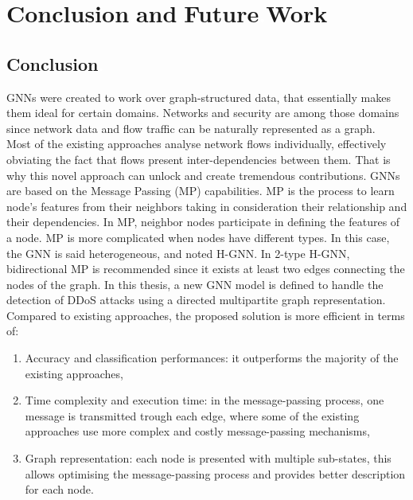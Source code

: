 \chapter{Conclusion\textcolor{white}{.}and\textcolor{white}{.}Future\textcolor{white}{.}Work}
\label{chapter:conclusion}

\section{Conclusion\textcolor{white}{.}}
GNNs were created to work over graph-structured data, that essentially makes
them ideal for certain domains. Networks and security are among those domains since network data and flow traffic can be naturally represented as a graph. \\
Most of the existing
approaches analyse network flows individually, effectively obviating the fact that
flows present inter-dependencies between them. That is why this novel approach
can unlock and create tremendous contributions.
GNNs are based on the Message Passing (MP) capabilities. MP is the process to learn node's features from their neighbors taking in consideration their relationship and their dependencies. In MP, neighbor nodes participate in defining the features of a node. MP is more complicated when nodes have different types. In this case, the GNN is said heterogeneous, and noted H-GNN. In 2-type H-GNN, bidirectional MP is recommended since it exists at least two edges connecting the nodes of the graph.
In this thesis, a new GNN model is defined to handle the detection of DDoS attacks using a directed multipartite graph representation.\\
Compared to existing approaches, the proposed solution is more efficient in terms of:
\begin{enumerate}
    \item Accuracy and classification performances: it outperforms the majority of the existing approaches,
    \item Time complexity and execution time: in the message-passing process, one message is transmitted trough each edge, where some of the existing approaches use more complex and costly message-passing mechanisms,
    \item Graph representation: each node is presented with multiple sub-states, this allows optimising the message-passing process and provides better description for each node.
\end{enumerate}
